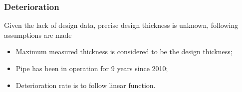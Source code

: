 
\subsubsection{Deterioration}
Given the lack of design data, precise design thickness is unknown, following assumptions are made

\begin{itemize}
\item Maximum measured thickness is considered to be the design thickness;
\item Pipe has been in operation for 9 years since 2010;
\item Deterioration rate is to follow linear function.
\end{itemize}



